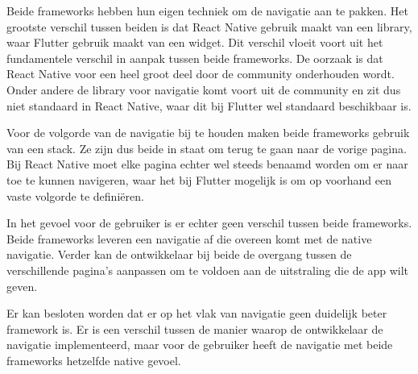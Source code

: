 Beide frameworks hebben hun eigen techniek om de navigatie aan te pakken. Het grootste verschil tussen beiden is dat React Native gebruik maakt van een library, waar Flutter gebruik maakt van een widget. Dit verschil vloeit voort uit het fundamentele verschil in aanpak tussen beide frameworks. De oorzaak is dat React Native voor een heel groot deel door de community onderhouden wordt. Onder andere de library voor navigatie komt voort uit de community en zit dus niet standaard in React Native, waar dit bij Flutter wel standaard beschikbaar is.

Voor de volgorde van de navigatie bij te houden maken beide frameworks gebruik van een stack. Ze zijn dus beide in staat om terug te gaan naar de vorige pagina. Bij React Native moet elke pagina echter wel steeds benaamd worden om er naar toe te kunnen navigeren, waar het bij Flutter mogelijk is om op voorhand een vaste volgorde te definiëren.

In het gevoel voor de gebruiker is er echter geen verschil tussen beide frameworks. Beide frameworks leveren een navigatie af die overeen komt met de native navigatie. Verder kan de ontwikkelaar bij beide de overgang tussen de verschillende pagina's aanpassen om te voldoen aan de uitstraling die de app wilt geven. 

Er kan besloten worden dat er op het vlak van navigatie geen duidelijk beter framework is. Er is een verschil tussen de manier waarop de ontwikkelaar de navigatie implementeerd, maar voor de gebruiker heeft de navigatie met beide frameworks hetzelfde native gevoel.



